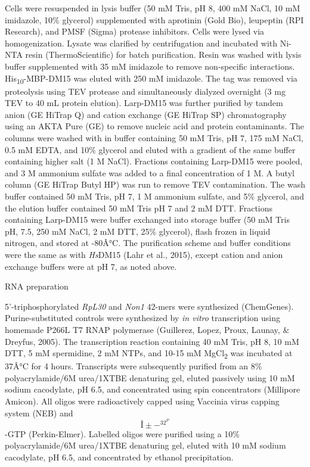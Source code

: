 \documentclass[12pt,twoside]{reedthesis}
\begin{document}
Cells were resuspended in lysis buffer (50 mM Tris, pH 8, 400 mM NaCl,
10 mM imidazole, 10\% glycerol) supplemented with aprotinin (Gold Bio),
leupeptin (RPI Research), and PMSF (Sigma) protease inhibitors. Cells
were lysed via homogenization. Lysate was clarified by centrifugation
and incubated with Ni-NTA resin (ThermoScientific) for batch
purification. Resin was washed with lysis buffer supplemented with 35 mM
imidazole to remove non-specific interactions. His\textsubscript{10}-MBP-DM15 was
eluted with 250 mM imidazole. The tag was removed via proteolysis using
TEV protease and simultaneously dialyzed overnight (3 mg TEV to 40 mL
protein elution). Larp-DM15 was further purified by tandem anion (GE
HiTrap Q) and cation exchange (GE HiTrap SP) chromatography using an
AKTA Pure (GE) to remove nucleic acid and protein contaminants. The
columns were washed with in buffer containing 50 mM Tris, pH 7, 175 mM
NaCl, 0.5 mM EDTA, and 10\% glycerol and eluted with a gradient of the
same buffer containing higher salt (1 M NaCl). Fractions containing
Larp-DM15 were pooled, and 3 M ammonium sulfate was added to a final
concentration of 1 M. A butyl column (GE HiTrap Butyl HP) was run to
remove TEV contamination. The wash buffer contained 50 mM Tris, pH 7, 1
M ammonium sulfate, and 5\% glycerol, and the elution buffer contained 50
mM Tris pH 7 and 2 mM DTT. Fractions containing Larp-DM15 were buffer
exchanged into storage buffer (50 mM Tris pH, 7.5, 250 mM NaCl, 2 mM
DTT, 25\% glycerol), flash frozen in liquid nitrogen, and stored at
-80Â°C. The purification scheme and buffer conditions were the same as
with \emph{Hs}DM15 (Lahr et al., 2015), except cation and
anion exchange buffers were at pH 7, as noted above.

{RNA preparation}

5'-triphosphorylated \emph{RpL30} and \emph{Non1} 42-mers were synthesized
(ChemGenes). Purine-substituted controls were synthesized by \emph{in vitro}
transcription using homemade P266L T7 RNAP polymerase
(Guillerez, Lopez, Proux, Launay, \& Dreyfus, 2005). The transcription reaction containing
40 mM Tris, pH 8, 10 mM DTT, 5 mM spermidine, 2 mM NTPs, and 10-15 mM
MgCl\textsubscript{2} was incubated at 37Â°C for 4 hours. Transcripts were subsequently
purified from an 8\% polyacrylamide/6M urea/1XTBE denaturing gel, eluted
passively using 10 mM sodium cacodylate, pH 6.5, and concentrated using
spin concentrators (Millipore Amicon). All oligos were radioactively
capped using Vaccinia virus capping system (NEB) and \[Î±-^32^P\]-GTP
(Perkin-Elmer). Labelled oligos were purified using a 10\%
polyacrylamide/6M urea/1XTBE denaturing gel, eluted with 10 mM sodium
cacodylate, pH 6.5, and concentrated by ethanol precipitation.
\end{document}
